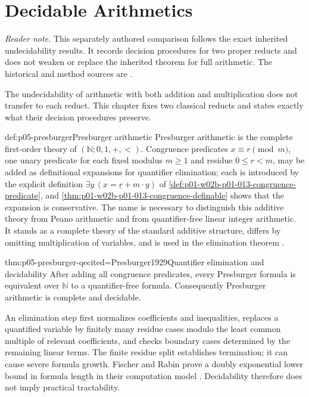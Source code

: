 \chapter{Decidable Arithmetics}\label{sec:p05-decidable-arithmetics}

\noindent\textit{Reader note.}  This separately authored comparison follows
the exact inherited undecidability results.  It records decision procedures
for two proper reducts and does not weaken or replace the inherited theorem for
full arithmetic.  The historical and method sources are
\cite{Presburger1929,Skolem1930Arithmetic,FefermanVaught1959}.

The undecidability of arithmetic with both addition and multiplication does not
transfer to each reduct. This chapter fixes two classical reducts and states
exactly what their decision procedures preserve.

\begin{hbdefinition}{def:p05-presburger}{Presburger arithmetic}
Presburger arithmetic is the complete first-order theory of
\((\mathbb N;0,1,+,<)\). Congruence predicates
\(x\equiv r\pmod m\), one unary predicate for each fixed modulus \(m\geq1\)
and residue \(0\leq r<m\), may be added as definitional expansions for
quantifier elimination; each is introduced by the explicit definition
\(\exists y\,(x=\underline r+m\cdot y)\) of
\cref{def:p01-w02b-p01-013-congruence-predicate}, and
\cref{thm:p01-w02b-p01-013-congruence-definable} shows that the expansion is
conservative. The name is necessary to distinguish this additive theory from
Peano arithmetic and from quantifier-free linear integer arithmetic. It stands
as a complete theory of the standard additive structure, differs by omitting
multiplication of variables, and is used in the elimination theorem
\cite{Presburger1929}.
\end{hbdefinition}

\begin{hbtheorem}{thm:p05-presburger-qe}{cited=Presburger1929}{Quantifier elimination and decidability}
After adding all congruence predicates, every Presburger formula is equivalent
over \(\mathbb N\) to a quantifier-free formula. Consequently Presburger
arithmetic is complete and decidable.
\end{hbtheorem}

An elimination step first normalizes coefficients and inequalities, replaces a
quantified variable by finitely many residue cases modulo the least common
multiple of relevant coefficients, and checks boundary cases determined by
the remaining linear terms. The finite residue split establishes termination;
it can cause severe formula growth. Fischer and Rabin prove a doubly
exponential lower bound in formula length in their computation model
\cite{FischerRabin1974}. Decidability therefore does not imply practical
tractability.

